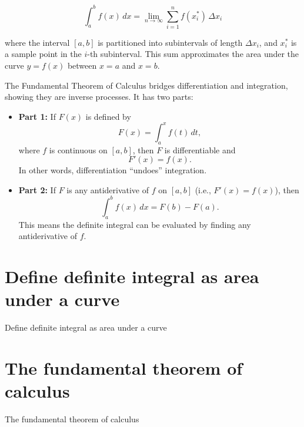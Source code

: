 \documentclass{book}
\begin{document}
\[
\int_a^b f(x) \, dx = \lim_{n \to \infty} \sum_{i=1}^n f(x_i^*) \, \Delta x_i
\]

where the interval \([a, b]\) is partitioned into subintervals of length \(\Delta x_i\), and \(x_i^*\) is a sample point in the \(i\)-th subinterval. This sum approximates the area under the curve \( y = f(x) \) between \( x = a \) and \( x = b \).

The Fundamental Theorem of Calculus bridges differentiation and integration, showing they are inverse processes. It has two parts:

\begin{itemize}
    \item \textbf{Part 1:} If \( F(x) \) is defined by
    \[
    F(x) = \int_a^x f(t) \, dt,
    \]
    where \( f \) is continuous on \([a,b]\), then \( F \) is differentiable and
    \[
    F'(x) = f(x).
    \]
    In other words, differentiation “undoes” integration.

    \item \textbf{Part 2:} If \( F \) is any antiderivative of \( f \) on \([a,b]\) (i.e., \( F'(x) = f(x) \)), then
    \[
    \int_a^b f(x) \, dx = F(b) - F(a).
    \]
    This means the definite integral can be evaluated by finding any antiderivative of \( f \).
\end{itemize}

\section{Define definite integral as area under a curve}

Define definite integral as area under a curve

\section{The fundamental theorem of calculus}

The fundamental theorem of calculus



\backmatter
 
\end{document}
